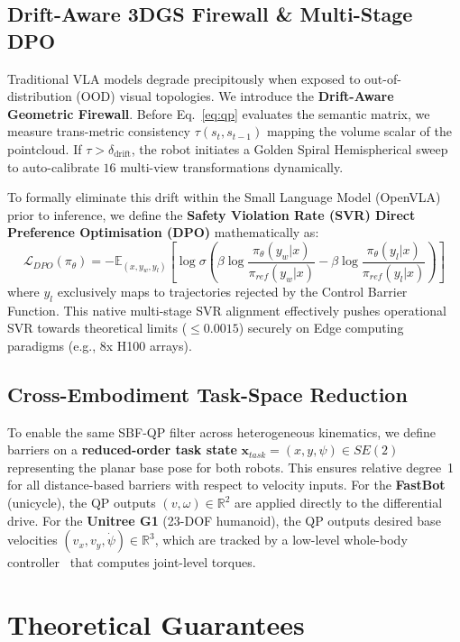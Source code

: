 \documentclass[conference]{IEEEtran}
\begin{document}
\subsection{Drift-Aware 3DGS Firewall \& Multi-Stage DPO}
Traditional VLA models degrade precipitously when exposed to out-of-distribution (OOD) visual topologies. We introduce the \textbf{Drift-Aware Geometric Firewall}. Before Eq.~\ref{eq:qp} evaluates the semantic matrix, we measure trans-metric consistency $\tau(s_t, s_{t-1})$ mapping the volume scalar of the pointcloud. If $\tau > \delta_{\text{drift}}$, the robot initiates a Golden Spiral Hemispherical sweep to auto-calibrate $16$ multi-view transformations dynamically.

To formally eliminate this drift within the Small Language Model (OpenVLA) prior to inference, we define the \textbf{Safety Violation Rate (SVR) Direct Preference Optimisation (DPO)} mathematically as:
\begin{equation}
\label{eq:dpo_cbf}
\mathcal{L}_{DPO}(\pi_\theta) = -\mathbb{E}_{(x, y_w, y_l)} \left[ \log \sigma \left( \beta \log \frac{\pi_\theta(y_w|x)}{\pi_{ref}(y_w|x)} - \beta \log \frac{\pi_\theta(y_l|x)}{\pi_{ref}(y_l|x)} \right) \right]
\end{equation}
where $y_l$ exclusively maps to trajectories rejected by the Control Barrier Function. This native multi-stage SVR alignment effectively pushes operational SVR towards theoretical limits ($\le 0.0015$) securely on Edge computing paradigms (e.g., 8x H100 arrays).

\subsection{Cross-Embodiment Task-Space Reduction}
To enable the same SBF-QP filter across heterogeneous kinematics, we define barriers on a \textbf{reduced-order task state} $\mathbf{x}_{task} = (x, y, \psi) \in SE(2)$ representing the planar base pose for both robots. This ensures relative degree~1 for all distance-based barriers with respect to velocity inputs. For the \textbf{FastBot} (unicycle), the QP outputs $(v, \omega) \in \mathbb{R}^2$ are applied directly to the differential drive. For the \textbf{Unitree G1} (23-DOF humanoid), the QP outputs desired base velocities $(v_x, v_y, \dot{\psi}) \in \mathbb{R}^3$, which are tracked by a low-level whole-body controller~\cite{margolis2022walkthesewaysim} that computes joint-level torques.

\section{Theoretical Guarantees}
\end{document}
